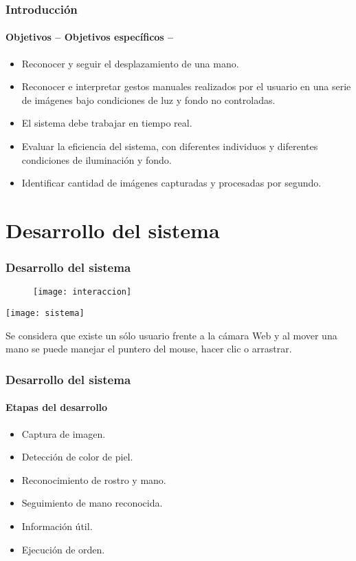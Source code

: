 \documentclass[xcolor=dvipsnames]{beamer}
\begin{document}
		\begin{frame}
			\transdissolve
			\frametitle{Introducción}
			\framesubtitle{Objetivos -- Objetivos específicos --}
			\begin{itemize}
			\item Reconocer y seguir el desplazamiento de una mano.
			\item Reconocer e interpretar gestos manuales realizados por el usuario en una serie de imágenes bajo condiciones de luz y fondo no controladas.
			\item El sistema debe trabajar en tiempo real.
			\item Evaluar la eficiencia del sistema, con diferentes individuos y diferentes condiciones de iluminación y fondo.
			\item Identificar cantidad de imágenes capturadas y procesadas por segundo.
			\end{itemize}
		\end{frame}


	\section{Desarrollo del sistema}
	\begin{frame}
		\transdissolve
		\frametitle{Desarrollo del sistema}
		\begin{center}
			\begin{minipage}[c]{.45\textwidth}
				\begin{figure}[h]
				\centering
				\texttt{[image: interaccion]}
				\end{figure}
			\end{minipage}
			\begin{minipage}[c]{.45\textwidth}
				\texttt{[image: sistema]}
			\end{minipage}
		\end{center}
		Se considera que existe un sólo usuario frente a la cámara Web y al mover una mano se puede manejar el puntero del mouse, hacer clic o arrastrar.
	\end{frame}

	\begin{frame}
		\transdissolve
		\frametitle{Desarrollo del sistema}
		\framesubtitle{Etapas del desarrollo}
		\begin{itemize}
		\item Captura de imagen. \pause
		\item Detección de color de piel. \pause
		\item Reconocimiento de rostro y mano. \pause
		\item Seguimiento de mano reconocida. \pause
		\item Información útil. \pause
		\item Ejecución de orden.
		\end{itemize}
	\end{frame}
\end{document}
